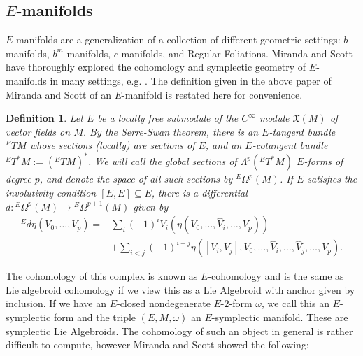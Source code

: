 \documentclass{amsart}
\newtheorem{definition}[theorem]{Definition}
\theoremstyle{definition}
\begin{document}
\begin{longtable}{|c|c|c|c|c|}
\end{longtable}


\subsection{\texorpdfstring{$E$}{}-manifolds}
$E$-manifolds are a generalization of a collection of different geometric settings: $b$-manifolds, $b^m$-manifolds, $c$-manifolds, and Regular Foliations. Miranda and Scott have thoroughly explored the cohomology and symplectic geometry of $E$-manifolds in many settings, e.g. \cite{Miranda_2020}. The definition given in the above paper of Miranda and Scott of an $E$-manifold is restated here for convenience.
\begin{definition}
Let $E$ be a locally free submodule of the $C^{\infty}$ module $\mathfrak{X}(M)$ of vector fields on $M$. By the Serre-Swan theorem, there is an $E$-tangent bundle ${ }^E T M$ whose sections (locally) are sections of $E$, and an $E$-cotangent bundle ${ }^E T^* M:=\left({ }^E T M\right)^*$. We will call the global sections of $\Lambda^p\left({ }^E T^* M\right)$ $E$-forms of degree $p$, and denote the space of all such sections by ${ }^E \Omega^p(M)$. If $E$ satisfies the involutivity condition $[E, E] \subseteq E$, there is a differential $d:{ }^E \Omega^p(M) \rightarrow{ }^E \Omega^{p+1}(M)$ given by
$$
\begin{aligned}
{}^E d \eta\left(V_0, \ldots, V_p\right)= & \sum_i(-1)^i V_i\left(\eta\left(V_0, \ldots, \hat{V}_i, \ldots, V_p\right)\right) \\
& +\sum_{i<j}(-1)^{i+j} \eta\left(\left[V_i, V_j\right], V_0, \ldots, \hat{V}_i, \ldots, \hat{V}_j, \ldots, V_p\right) .
\end{aligned}
$$
\end{definition}
The cohomology of this complex is known as $E$-cohomology and is the same as Lie algebroid cohomology if we view this as a Lie Algebroid with anchor given by inclusion. If we have an $E$-closed nondegenerate $E$-$2$-form $\omega$, we call this an $E$-symplectic form and the triple $(E,M,\omega)$ an $E$-symplectic manifold. These are symplectic Lie Algebroids. The cohomology of such an object in general is rather difficult to compute, however Miranda and Scott showed the following:
\end{document}
